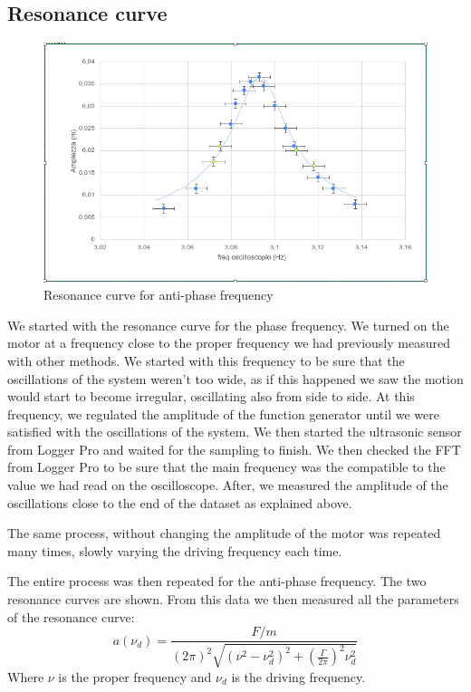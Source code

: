 \documentclass{article}
\begin{document}
\subsection{Resonance curve}
\begin{figure}
  \begin{center}
    \includegraphics[width=\textwidth]{lorentz_contro}
  \end{center}
  \label{img:res_contro}
  \caption{Resonance curve for anti-phase frequency}
\end{figure}
We started with the resonance curve for the phase frequency. We turned on the motor at a frequency close to the proper frequency we had previously measured with other methods. We started with this frequency to be sure that the oscillations of the system weren't too wide, as if this happened we saw the motion would start to become irregular, oscillating also from side to side. At this frequency, we regulated the amplitude of the function generator until we were satisfied with the oscillations of the system. We then started the ultrasonic sensor from Logger Pro and waited for the sampling to finish. We then checked the FFT from Logger Pro to be sure that the main frequency was the compatible to the value we had read on the oscilloscope. After, we measured the amplitude of the oscillations close to the end of the dataset as explained above. 

The same process, without changing the amplitude of the motor was repeated many times, slowly varying the driving frequency each time. 

The entire process was then repeated for the anti-phase frequency. The two resonance curves are shown. 
From this data we then measured all the parameters of the resonance curve: 
\begin{equation}
    a (\nu_d) = \frac{F/m}{  (2\pi)^2
                \sqrt{( \nu^2 - \nu_d^2 )^2 +
                \left ( \frac{\Gamma}{2\pi} \right )^2 \nu_d^2}}
\end{equation}  
Where $\nu$ is the proper frequency and $\nu_d$ is the driving frequency.
\end{document}
